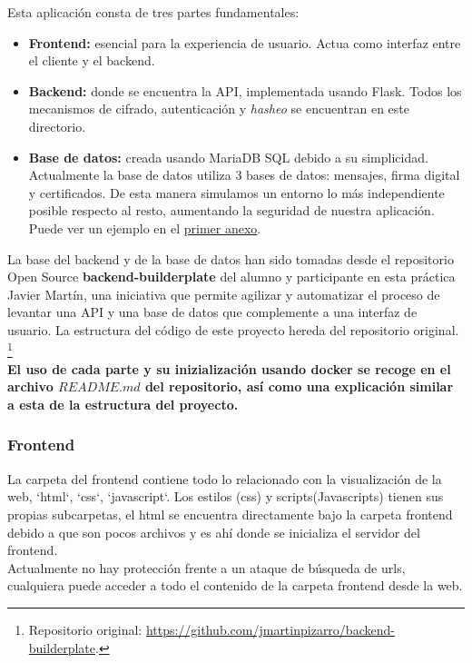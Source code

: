 \documentclass[a4paper,11pt]{article}
\begin{document}
Esta aplicación consta de tres partes fundamentales:
\begin{itemize}
    \item \textbf{Frontend:} esencial para la experiencia de usuario. Actua como interfaz entre el cliente y el backend.
    \item \textbf{Backend:} donde se encuentra la API, implementada usando
        Flask. Todos los mecanismos de cifrado, autenticación y \textit{hasheo} se encuentran en este directorio.
    \item \textbf{Base de datos:} creada usando MariaDB SQL debido a su
        simplicidad. Actualmente la base de datos utiliza 3 bases de datos:
        mensajes, firma digital y certificados. De esta manera simulamos un entorno lo más independiente
        posible respecto al resto, aumentando la seguridad de nuestra aplicación. Puede ver un ejemplo en el
        \hyperref[sec:TablasSQL]{primer anexo}. 
\end{itemize}
La base del backend y de la base de datos han sido tomadas desde el repositorio
Open Source \textbf{backend-builderplate} del alumno y participante en esta
práctica Javier Martín, una iniciativa que permite agilizar y automatizar el
proceso de levantar una API y una base de datos que complemente a una interfaz
de usuario. La estructura del código de este proyecto hereda del repositorio original.%
\footnote{Repositorio original:
\url{https://github.com/jmartinpizarro/backend-builderplate}.}\\

\textbf{El uso de cada parte y su inizialización usando docker se recoge en el
archivo $README.md$ del repositorio, así como una explicación similar a esta de
la estructura del proyecto.}\\

\subsubsection{Frontend}
La carpeta del frontend contiene todo lo relacionado con la visualización de la
web, `html`, `css`, `javascript`. Los estilos (css) y scripts(Javascripts)
tienen sus propias subcarpetas, el html se encuentra directamente bajo la
carpeta frontend debido a que son pocos archivos y es ahí donde se inicializa el
servidor del frontend. \\

Actualmente no hay protección frente a un ataque de búsqueda de urls, cualquiera puede acceder a todo el contenido de la carpeta frontend desde la web.
\end{document}

